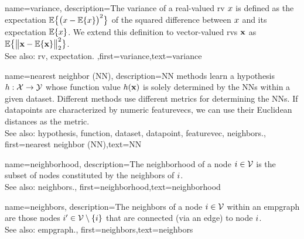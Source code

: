 


{
	name={variance},
	description={The variance of a real-valued \gls{rv} $x$ is defined as the \gls{expectation} 
		$\mathbb{E}\big\{ \big( x - \mathbb{E}\{x \} \big)^{2} \big\}$ of the squared difference between $x$ 
		and its \gls{expectation} $\mathbb{E}\{x \}$. We extend this definition to vector-valued \glspl{rv} ${\bf x}$ 
		as $\mathbb{E}\big\{ \big\| {\bf x} - \mathbb{E}\{{\bf x} \} \big\|_{2}^{2} \big\}$.
					\\ 
		See also: \gls{rv}, \gls{expectation}.} ,first={variance},text={variance} 
}

{
	name={nearest neighbor (NN)},
	description={NN methods learn a \gls{hypothesis} 
		$h: \mathcal{X} \rightarrow \mathcal{Y}$ whose \gls{function} value $h({\bf x})$ 
		is solely determined by the NNs within a given \gls{dataset}. Different 
		methods use different metrics for determining the NNs. If \glspl{datapoint} 
		are characterized by numeric \glspl{featurevec}, we can use their Euclidean distances as 
		the metric.
					\\ 
		See also: \gls{hypothesis}, \gls{function}, \gls{dataset}, \gls{datapoint}, \gls{featurevec}, \gls{neighbors}.},
	first={nearest neighbor (NN)},text={NN} 
}

{
	name={neighborhood},
	description={The neighborhood of a node $i \in \mathcal{V}$ is 
	the subset of nodes constituted by the \gls{neighbors} of $i$.
				\\ 
		See also: \gls{neighbors}.},
	first={neighborhood},text={neighborhood} 
}


{
	name={neighbors},
	description={The neighbors of a node $i \in \mathcal{V}$ 
	within an \gls{empgraph} are those nodes $i' \in \mathcal{V} \setminus \{ i\}$ that are connected (via an edge) to node $i$.
				\\ 
		See also: \gls{empgraph}.},
	first={neighbors},text={neighbors} 
}

